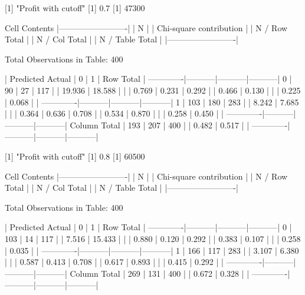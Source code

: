 \documentclass{article}
\begin{document}
\begin{Schunk}
\begin{Soutput}
 
[1] "Profit with cutoff"
[1] 0.7
[1] 47300

 
   Cell Contents
|-------------------------|
|                       N |
| Chi-square contribution |
|           N / Row Total |
|           N / Col Total |
|         N / Table Total |
|-------------------------|

 
Total Observations in Table:  400 

 
             | Predicted 
      Actual |         0 |         1 | Row Total | 
-------------|-----------|-----------|-----------|
           0 |        90 |        27 |       117 | 
             |    19.936 |    18.588 |           | 
             |     0.769 |     0.231 |     0.292 | 
             |     0.466 |     0.130 |           | 
             |     0.225 |     0.068 |           | 
-------------|-----------|-----------|-----------|
           1 |       103 |       180 |       283 | 
             |     8.242 |     7.685 |           | 
             |     0.364 |     0.636 |     0.708 | 
             |     0.534 |     0.870 |           | 
             |     0.258 |     0.450 |           | 
-------------|-----------|-----------|-----------|
Column Total |       193 |       207 |       400 | 
             |     0.482 |     0.517 |           | 
-------------|-----------|-----------|-----------|

 
[1] "Profit with cutoff"
[1] 0.8
[1] 60500

 
   Cell Contents
|-------------------------|
|                       N |
| Chi-square contribution |
|           N / Row Total |
|           N / Col Total |
|         N / Table Total |
|-------------------------|

 
Total Observations in Table:  400 

 
             | Predicted 
      Actual |         0 |         1 | Row Total | 
-------------|-----------|-----------|-----------|
           0 |       103 |        14 |       117 | 
             |     7.516 |    15.433 |           | 
             |     0.880 |     0.120 |     0.292 | 
             |     0.383 |     0.107 |           | 
             |     0.258 |     0.035 |           | 
-------------|-----------|-----------|-----------|
           1 |       166 |       117 |       283 | 
             |     3.107 |     6.380 |           | 
             |     0.587 |     0.413 |     0.708 | 
             |     0.617 |     0.893 |           | 
             |     0.415 |     0.292 |           | 
-------------|-----------|-----------|-----------|
Column Total |       269 |       131 |       400 | 
             |     0.672 |     0.328 |           | 
-------------|-----------|-----------|-----------|


\end{Soutput}
\end{Schunk}
\end{document}
